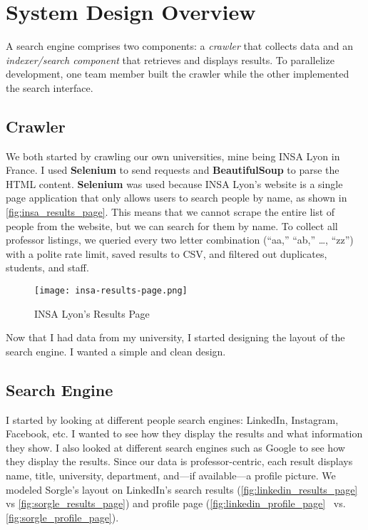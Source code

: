 \section{System Design Overview}

A search engine comprises two components: a \emph{crawler} that collects data and an \emph{indexer\slash search component} that retrieves and displays results. To parallelize development, one team member built the crawler while the other implemented the search interface.

\subsection{Crawler}

We both started by crawling our own universities, mine being INSA Lyon in France. I used \textbf{Selenium} to send requests and \textbf{BeautifulSoup} to parse the HTML content. \textbf{Selenium} was used because INSA Lyon's website is a single page application that only allows users to search people by name, as shown in \autoref{fig:insa_results_page}. This means that we cannot scrape the entire list of people from the website, but we can search for them by name. To collect all professor listings, we queried every two letter combination (``aa,'' ``ab,'' …, ``zz'') with a polite rate limit, saved results to CSV, and filtered out duplicates, students, and staff.

\begin{figure}[ht]
	\centering
	\texttt{[image: insa-results-page.png]}
	\caption{INSA Lyon's Results Page}
	\label{fig:insa_results_page}
\end{figure}

Now that I had data from my university, I started designing the layout of the search engine. I wanted a simple and clean design.

\subsection{Search Engine}

I started by looking at different people search engines: LinkedIn, Instagram, Facebook, etc. I wanted to see how they display the results and what information they show. I also looked at different search engines such as Google to see how they display the results. Since our data is professor-centric, each result displays name, title, university, department, and—if available—a profile picture. We modeled Sorgle's layout on LinkedIn's search results (\autoref{fig:linkedin_results_page}~\cite{linkedin2025} vs \autoref{fig:sorgle_results_page}) and profile page (\autoref{fig:linkedin_profile_page}~\cite{linkedin2025} vs. \autoref{fig:sorgle_profile_page}).

